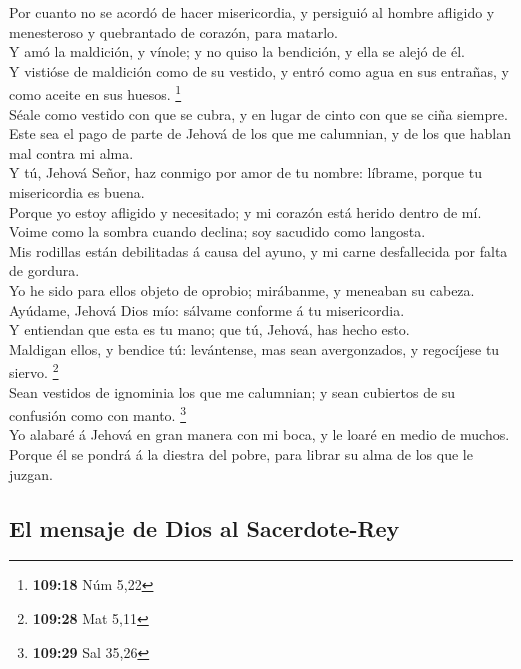  Por cuanto no se acordó de hacer misericordia, y
persiguió al hombre afligido y menesteroso y quebrantado de corazón,
para matarlo.\\
 Y amó la maldición, y vínole; y no quiso la bendición, y
ella se alejó de él.\\
 Y vistióse de maldición como de su vestido, y entró como
agua en sus entrañas, y como aceite en sus huesos. \footnote{\textbf{109:18}
  Núm 5,22}\\
 Séale como vestido con que se cubra, y en lugar de cinto
con que se ciña siempre.\\
 Este sea el pago de parte de Jehová de los que me
calumnian, y de los que hablan mal contra mi alma.\\
 Y tú, Jehová Señor, haz conmigo por amor de tu nombre:
líbrame, porque tu misericordia es buena.\\
 Porque yo estoy afligido y necesitado; y mi corazón está
herido dentro de mí.\\
 Voime como la sombra cuando declina; soy sacudido como
langosta.\\
 Mis rodillas están debilitadas á causa del ayuno, y mi
carne desfallecida por falta de gordura.\\
 Yo he sido para ellos objeto de oprobio; mirábanme, y
meneaban su cabeza.\\
 Ayúdame, Jehová Dios mío: sálvame conforme á tu
misericordia.\\
 Y entiendan que esta es tu mano; que tú, Jehová, has
hecho esto.\\
 Maldigan ellos, y bendice tú: levántense, mas sean
avergonzados, y regocíjese tu siervo. \footnote{\textbf{109:28} Mat 5,11}\\
 Sean vestidos de ignominia los que me calumnian; y sean
cubiertos de su confusión como con manto. \footnote{\textbf{109:29} Sal
  35,26}\\
 Yo alabaré á Jehová en gran manera con mi boca, y le
loaré en medio de muchos.\\
 Porque él se pondrá á la diestra del pobre, para librar
su alma de los que le juzgan.

\hypertarget{el-mensaje-de-dios-al-sacerdote-rey}{%
\subsection{El mensaje de Dios al
Sacerdote-Rey}\label{el-mensaje-de-dios-al-sacerdote-rey}}

